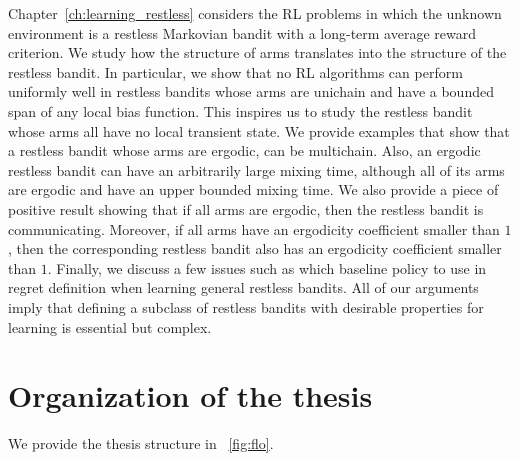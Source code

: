 Chapter~\ref{ch:learning_restless} considers the RL problems in which the unknown environment is a restless Markovian bandit with a long-term average reward criterion.
We study how the structure of arms translates into the structure of the restless bandit.
In particular, we show that no RL algorithms can perform uniformly well in restless bandits whose arms are unichain and have a bounded span of any local bias function.
This inspires us to study the restless bandit whose arms all have no local transient state.
We provide examples that show that a restless bandit whose arms are ergodic, can be multichain.
Also, an ergodic restless bandit can have an arbitrarily large mixing time, although all of its arms are ergodic and have an upper bounded mixing time.
We also provide a piece of positive result showing that if all arms are ergodic, then the restless bandit is communicating.
Moreover, if all arms have an ergodicity coefficient smaller than $1$, then the corresponding restless bandit also has an ergodicity coefficient smaller than $1$.
Finally, we discuss a few issues such as which baseline policy to use in regret definition when learning general restless bandits.
All of our arguments imply that defining a subclass of restless bandits with desirable properties for learning is essential but complex.

\section{Organization of the thesis}

We provide the thesis structure in \figurename~\ref{fig:flo}.


